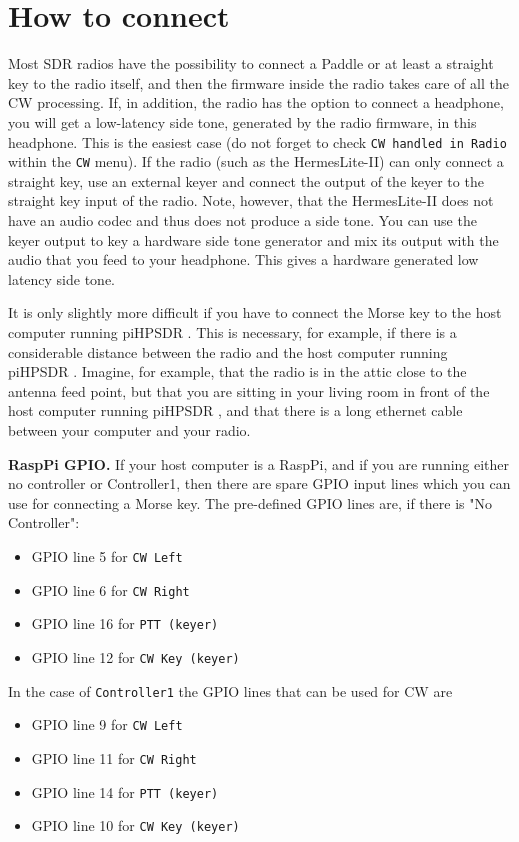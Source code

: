 \documentclass[12pt]{book}
\def\rett#1{\texttt{\color{red}#1}}
\def\bltt#1{\texttt{\color{blue}#1}}
\def\pH{pi\-HPSDR }
\begin{document}
\section{How to connect}
Most SDR radios have the possibility to connect a Paddle or at least a straight key to the
radio itself, and then the firmware inside the radio takes care of all the CW processing.
If, in addition, the radio has the option to  connect a headphone, you will get a low-latency
side tone, generated by the radio firmware, in this headphone.
This is the easiest case (do not forget to check \rett{CW handled in Radio} within the
\bltt{CW} menu). If the radio (such as the HermesLite-II) can only connect a straight key,
use an external keyer and connect the output of the keyer to the straight key input of the radio.
Note, however, that the HermesLite-II does not have an audio codec and thus does not produce a
side tone. You can use the keyer output to key a hardware side tone generator and mix its
output with the audio that you feed to your headphone. This gives a hardware generated low
latency side tone.

It is only slightly more difficult if you have to connect the Morse key to the host computer running
\pH. This is necessary, for example, if there is a considerable distance between the
radio and the host computer running \pH. Imagine, for example, that the radio is
in the attic close to the antenna feed point, but that you are sitting in your living room
in front of the host computer running \pH, and that there is a long ethernet cable
between your computer and your radio.

\textbf{RaspPi GPIO.} If your host computer is a RaspPi, and if you are running either no controller
or Controller1, then there are spare GPIO input lines which you can use for connecting a Morse
key. The pre-defined GPIO lines are, if there is "No Controller":

\begin{itemize}
\item{GPIO line 5 for \bltt{CW Left}}
\item{GPIO line 6 for \bltt{CW Right}}
\item{GPIO line 16 for \bltt{PTT (keyer)}}
\item{GPIO line 12 for \bltt{CW Key (keyer)}}
\end{itemize}

In the case of \texttt{Controller1} the GPIO lines that can be used for CW are

\begin{itemize}
\item{GPIO line 9 for \bltt{CW Left}}
\item{GPIO line 11 for \bltt{CW Right}}
\item{GPIO line 14 for \bltt{PTT (keyer)}}
\item{GPIO line 10 for \bltt{CW Key (keyer)}}
\end{itemize}
\end{document}
